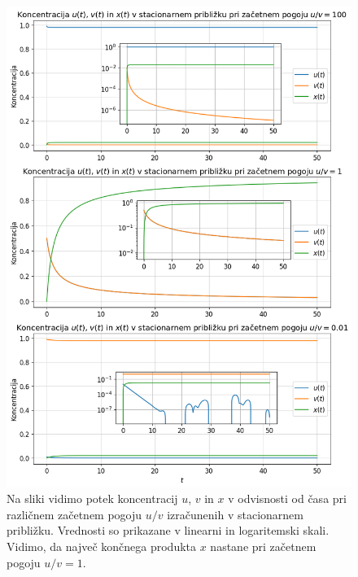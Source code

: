 \documentclass[slovene,11pt,a4paper]{article}
\begin{document}
\begin{figure}[h!]
\centering
\includegraphics[width=15cm]{bromid2.png}
\caption{Na sliki vidimo potek koncentracij $u$, $v$ in $x$ v odvisnosti od časa pri različnem začetnem pogoju $u/v$ izračunenih v stacionarnem približku. Vrednosti so prikazane v linearni in logaritemski skali. Vidimo, da največ končnega produkta $x$ nastane pri začetnem pogoju $u/v = 1$.}
\end{figure}

\newpage
\end{document}
